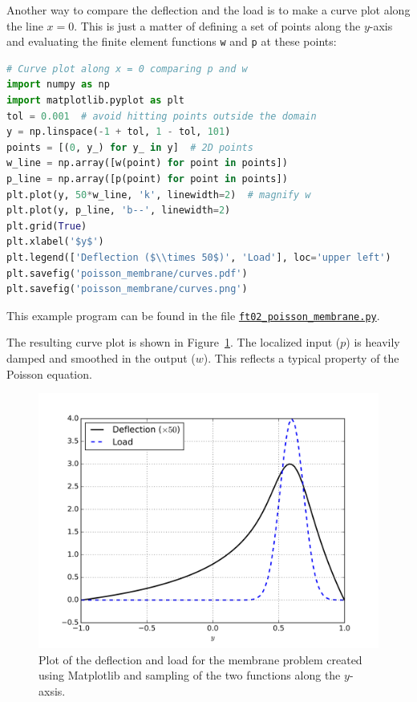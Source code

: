 \documentclass[graybox,envcountchap,sectrefs,final]{svmonodo}
\begin{document}


Another way to compare the deflection and the load is to make a curve plot
along the line $x=0$. This is just a matter of defining a set of points
along the $y$-axis and evaluating the finite element functions \texttt{w} and \texttt{p}
at these points:

\begin{lstlisting}[language=Python,style=graycolor]
# Curve plot along x = 0 comparing p and w
import numpy as np
import matplotlib.pyplot as plt
tol = 0.001  # avoid hitting points outside the domain
y = np.linspace(-1 + tol, 1 - tol, 101)
points = [(0, y_) for y_ in y]  # 2D points
w_line = np.array([w(point) for point in points])
p_line = np.array([p(point) for point in points])
plt.plot(y, 50*w_line, 'k', linewidth=2)  # magnify w
plt.plot(y, p_line, 'b--', linewidth=2)
plt.grid(True)
plt.xlabel('$y$')
plt.legend(['Deflection ($\\times 50$)', 'Load'], loc='upper left')
plt.savefig('poisson_membrane/curves.pdf')
plt.savefig('poisson_membrane/curves.png')
\end{lstlisting}
This example program can be found in the file \href{{https://fenicsproject.org/pub/tutorial/python/vol1/ft02_poisson_membrane.py}}{\nolinkurl{ft02_poisson_membrane.py}}.

The resulting curve plot is shown in Figure~\ref{fig:poisson_membrane_curves}. The localized input ($p$) is heavily
damped and smoothed in the output ($w$). This reflects a typical
property of the Poisson equation.


\begin{figure}[!ht]  %
  \centerline{\includegraphics[width=0.95\linewidth]{fig/poisson_membrane_curves.png}}
  \caption{
  Plot of the deflection and load for the membrane problem created using Matplotlib and sampling of the two functions along the $y$-axsis. \label{fig:poisson_membrane_curves}
  }
\end{figure}
\end{document}
